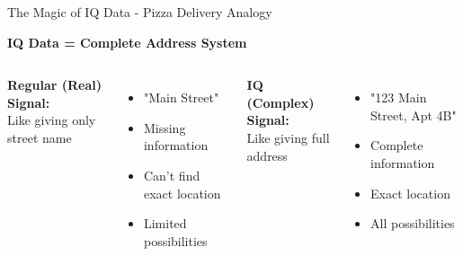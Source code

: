 \documentclass[aspectratio=169,11pt]{beamer}
\begin{document}
\begin{frame}{The Magic of IQ Data - Pizza Delivery Analogy}
\begin{center}
\Large\textbf{IQ Data = Complete Address System}
\end{center}
\vspace{1em}
\begin{columns}
\textbf{Regular (Real) Signal:}\\
Like giving only street name
\begin{itemize}
    \item "Main Street"
    \item Missing information
    \item Can't find exact location
    \item Limited possibilities
\end{itemize}

\textbf{IQ (Complex) Signal:}\\
Like giving full address
\begin{itemize}
    \item "123 Main Street, Apt 4B"
    \item Complete information
    \item Exact location
    \item All possibilities
\end{itemize}
\end{columns}
\vspace{1em}
\end{frame}
\end{document}
